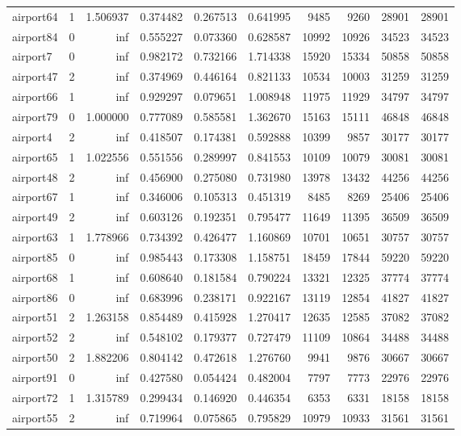 \begin{longtable}{|l|r|r|r|r|r|r|r|r|r|}
airport64 & 1 & 1.506937 & 0.374482 & 0.267513 & 0.641995 & 9485 & 9260 & 28901 & 28901 \\
airport84 & 0 & inf & 0.555227 & 0.073360 & 0.628587 & 10992 & 10926 & 34523 & 34523 \\
airport7 & 0 & inf & 0.982172 & 0.732166 & 1.714338 & 15920 & 15334 & 50858 & 50858 \\
airport47 & 2 & inf & 0.374969 & 0.446164 & 0.821133 & 10534 & 10003 & 31259 & 31259 \\
airport66 & 1 & inf & 0.929297 & 0.079651 & 1.008948 & 11975 & 11929 & 34797 & 34797 \\
airport79 & 0 & 1.000000 & 0.777089 & 0.585581 & 1.362670 & 15163 & 15111 & 46848 & 46848 \\
airport4 & 2 & inf & 0.418507 & 0.174381 & 0.592888 & 10399 & 9857 & 30177 & 30177 \\
airport65 & 1 & 1.022556 & 0.551556 & 0.289997 & 0.841553 & 10109 & 10079 & 30081 & 30081 \\
airport48 & 2 & inf & 0.456900 & 0.275080 & 0.731980 & 13978 & 13432 & 44256 & 44256 \\
airport67 & 1 & inf & 0.346006 & 0.105313 & 0.451319 & 8485 & 8269 & 25406 & 25406 \\
airport49 & 2 & inf & 0.603126 & 0.192351 & 0.795477 & 11649 & 11395 & 36509 & 36509 \\
airport63 & 1 & 1.778966 & 0.734392 & 0.426477 & 1.160869 & 10701 & 10651 & 30757 & 30757 \\
airport85 & 0 & inf & 0.985443 & 0.173308 & 1.158751 & 18459 & 17844 & 59220 & 59220 \\
airport68 & 1 & inf & 0.608640 & 0.181584 & 0.790224 & 13321 & 12325 & 37774 & 37774 \\
airport86 & 0 & inf & 0.683996 & 0.238171 & 0.922167 & 13119 & 12854 & 41827 & 41827 \\
airport51 & 2 & 1.263158 & 0.854489 & 0.415928 & 1.270417 & 12635 & 12585 & 37082 & 37082 \\
airport52 & 2 & inf & 0.548102 & 0.179377 & 0.727479 & 11109 & 10864 & 34488 & 34488 \\
airport50 & 2 & 1.882206 & 0.804142 & 0.472618 & 1.276760 & 9941 & 9876 & 30667 & 30667 \\
airport91 & 0 & inf & 0.427580 & 0.054424 & 0.482004 & 7797 & 7773 & 22976 & 22976 \\
airport72 & 1 & 1.315789 & 0.299434 & 0.146920 & 0.446354 & 6353 & 6331 & 18158 & 18158 \\
airport55 & 2 & inf & 0.719964 & 0.075865 & 0.795829 & 10979 & 10933 & 31561 & 31561 \\

\end{longtable}
